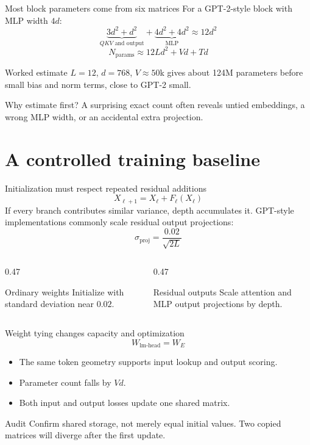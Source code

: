 \documentclass[handout]{beamer}
\begin{document}
\begin{frame}{Most block parameters come from six matrices}
  For a GPT-2-style block with MLP width $4d$:
  \[
    \underbrace{3d^2+d^2}_{QKV\text{ and output}}
    +\underbrace{4d^2+4d^2}_{\text{MLP}}
    \approx 12d^2
  \]
  \[
    N_{\text{params}}\approx 12Ld^2 + Vd + Td
  \]
  \begin{block}{Worked estimate}
    $L=12$, $d=768$, $V\approx50$k gives about 124M parameters before small bias and norm terms, close to GPT-2 small.
  \end{block}
  \begin{alertblock}{Why estimate first?}
    A surprising exact count often reveals untied embeddings, a wrong MLP width, or an accidental extra projection.
  \end{alertblock}
\end{frame}

\section{A controlled training baseline}

\begin{frame}{Initialization must respect repeated residual additions}
  \[
    X_{\ell+1}=X_\ell+F_\ell(X_\ell)
  \]
  If every branch contributes similar variance, depth accumulates it. GPT-style implementations commonly scale residual output projections:
  \[
    \sigma_{\text{proj}}=\frac{0.02}{\sqrt{2L}}
  \]
  \begin{columns}[t]
    \begin{column}{0.47\linewidth}
      \begin{block}{Ordinary weights}
        Initialize with standard deviation near $0.02$.
      \end{block}
    \end{column}
    \begin{column}{0.47\linewidth}
      \begin{block}{Residual outputs}
        Scale attention and MLP output projections by depth.
      \end{block}
    \end{column}
  \end{columns}
\end{frame}

\begin{frame}{Weight tying changes capacity and optimization}
  \[
    W_{\text{lm-head}} = W_E
  \]
  \begin{itemize}
    \setlength{\itemsep}{8pt}
    \item The same token geometry supports input lookup and output scoring.
    \item Parameter count falls by $Vd$.
    \item Both input and output losses update one shared matrix.
  \end{itemize}
  \begin{alertblock}{Audit}
    Confirm shared storage, not merely equal initial values. Two copied matrices will diverge after the first update.
  \end{alertblock}
\end{frame}
\end{document}
